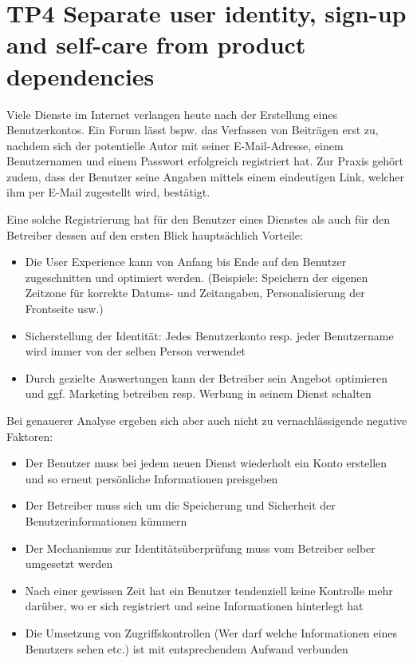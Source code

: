 \section{TP4 Separate user identity, sign-up and self-care from product dependencies}
\label{sec:principle-tp4-seperate-user-identity}

Viele Dienste im Internet verlangen heute nach der Erstellung eines Benutzerkontos. Ein Forum lässt bspw. das Verfassen von Beiträgen erst zu, nachdem sich der potentielle Autor mit seiner E-Mail-Adresse, einem Benutzernamen und einem Passwort erfolgreich registriert hat. Zur Praxis gehört zudem, dass der Benutzer seine Angaben mittels einem eindeutigen Link, welcher ihm per E-Mail zugestellt wird, bestätigt.

Eine solche Registrierung hat für den Benutzer eines Dienstes als auch für den Betreiber dessen auf den ersten Blick hauptsächlich Vorteile:

\begin{itemize}
	\item Die User Experience kann von Anfang bis Ende auf den Benutzer zugeschnitten und optimiert werden. (Beispiele: Speichern der eigenen Zeitzone für korrekte Datums- und Zeitangaben, Personalisierung der Frontseite usw.)
	\item Sicherstellung der Identität: Jedes Benutzerkonto resp. jeder Benutzername wird immer von der selben Person verwendet
	\item Durch gezielte Auswertungen kann der Betreiber sein Angebot optimieren und ggf. Marketing betreiben resp. Werbung in seinem Dienst schalten
\end{itemize}

Bei genauerer Analyse ergeben sich aber auch nicht zu vernachlässigende negative Faktoren:

\begin{itemize}
	\item Der Benutzer muss bei jedem neuen Dienst wiederholt ein Konto erstellen und so erneut persönliche Informationen preisgeben
	\item Der Betreiber muss sich um die Speicherung und Sicherheit der Benutzerinformationen kümmern
	\item Der Mechanismus zur Identitätsüberprüfung muss vom Betreiber selber umgesetzt werden
	\item Nach einer gewissen Zeit hat ein Benutzer tendenziell keine Kontrolle mehr darüber, wo er sich registriert und seine Informationen hinterlegt hat
	\item Die Umsetzung von Zugriffskontrollen (Wer darf welche Informationen eines Benutzers sehen etc.) ist mit entsprechendem Aufwand verbunden
\end{itemize}

